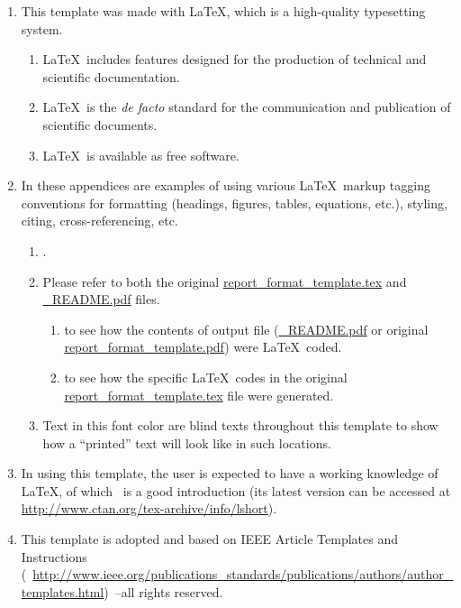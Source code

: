 \begin{enumerate}
	\item This template was made with \LaTeX, which is a high-quality typesetting system. 
		
	\begin{enumerate}
		\item \LaTeX\ includes features designed for the production of technical and scientific documentation. 
	
		\item \LaTeX\ is the \textit{de facto} standard for the communication and publication of scientific documents. 
		
		\item \LaTeX\ is available as free software. 
	\end{enumerate}
			
	\item In these appendices are examples of using various \LaTeX\ markup tagging conventions for formatting (headings, figures, tables, equations, etc.), styling, citing, cross-referencing, etc.
		
	\begin{enumerate}
		\item  \emph{}. 
		
		\item Please refer to both the original \url{report_format_template.tex} and \url{_README.pdf} files. 
		
		\begin{enumerate}
			\item {} to see how the contents of output file (\url{_README.pdf} or original \url{report_format_template.pdf}) were \LaTeX\ coded.
			
			\item {} to see how the specific \LaTeX\ codes in the original \url{report_format_template.tex} file were generated.
		\end{enumerate}
						
		\item Text in this \textcolor[rgb]{1,1,0}{font color} are blind texts throughout this template to show how a ``printed'' text will look like in such locations.
	\end{enumerate}
	
	\item In using this template, the user is expected to have a working knowledge of \LaTeX, of which~\cite{Oetiker2014} is a good introduction (its latest version can be accessed at \url{http://www.ctan.org/tex-archive/info/lshort}). 
	
	\item This template is adopted and based on IEEE Article Templates and Instructions (~\url{http://www.ieee.org/publications_standards/publications/authors/author_templates.html})~\cite{Shell2015, IEEEMSW2013}--all rights reserved.
\end{enumerate}
